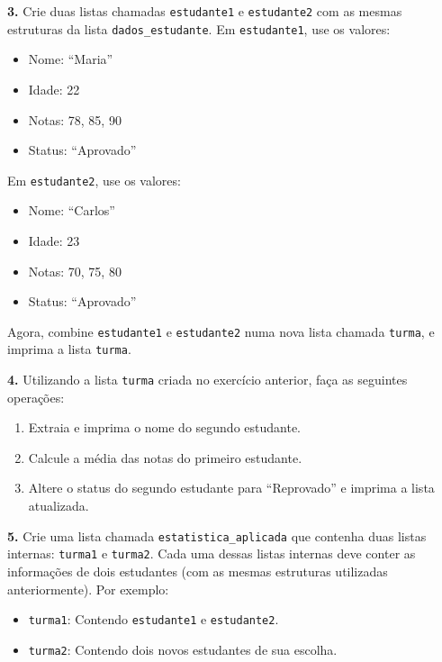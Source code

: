 \documentclass[
]{book}
\providecommand{\tightlist}{%
  \setlength{\itemsep}{0pt}\setlength{\parskip}{0pt}}
\begin{document}
\textbf{3.} Crie duas listas chamadas \texttt{estudante1} e \texttt{estudante2} com as
mesmas estruturas da lista \texttt{dados\_estudante}. Em \texttt{estudante1}, use os
valores:

\begin{itemize}
\tightlist
\item
  Nome: ``Maria''
\item
  Idade: 22
\item
  Notas: 78, 85, 90
\item
  Status: ``Aprovado''
\end{itemize}

Em \texttt{estudante2}, use os valores:

\begin{itemize}
\tightlist
\item
  Nome: ``Carlos''
\item
  Idade: 23
\item
  Notas: 70, 75, 80
\item
  Status: ``Aprovado''
\end{itemize}

Agora, combine \texttt{estudante1} e \texttt{estudante2} numa nova lista chamada
\texttt{turma}, e imprima a lista \texttt{turma}.

\textbf{4.} Utilizando a lista \texttt{turma} criada no exercício anterior, faça as
seguintes operações:

\begin{enumerate}
\def\labelenumi{(\alph{enumi})}
\tightlist
\item
  Extraia e imprima o nome do segundo estudante.
\item
  Calcule a média das notas do primeiro estudante.
\item
  Altere o status do segundo estudante para ``Reprovado'' e imprima a
  lista atualizada.
\end{enumerate}

\textbf{5.} Crie uma lista chamada \texttt{estatistica\_aplicada} que contenha duas
listas internas: \texttt{turma1} e \texttt{turma2}. Cada uma dessas listas internas
deve conter as informações de dois estudantes (com as mesmas estruturas
utilizadas anteriormente). Por exemplo:

\begin{itemize}
\tightlist
\item
  \texttt{turma1}: Contendo \texttt{estudante1} e \texttt{estudante2}.
\item
  \texttt{turma2}: Contendo dois novos estudantes de sua escolha.
\end{itemize}
\end{document}
